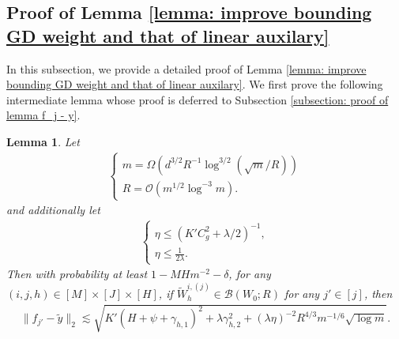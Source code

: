 \documentclass{article} \usepackage{iclr2023/iclr2023_conference,times}
\newtheorem{lemma}{Lemma}[section]
\begin{document}
\subsection{Proof of Lemma \ref{lemma: improve bounding GD weight and that of linear auxilary}}
In this subsection, we provide a detailed proof of Lemma \ref{lemma: improve bounding GD weight and that of linear auxilary}. We first prove the following intermediate lemma whose proof is deferred to Subsection \ref{subsection: proof of lemma f_j - y}. 

\begin{lemma}
Let 
\begin{align*}
    \begin{cases}
        m = \Omega \left( d^{3/2}  R^{-1} \log^{3/2} (\sqrt{m} / R) \right) \\
      R = \mathcal{O} \left( m^{1/2} \log^{-3} m \right). 
    \end{cases}
\end{align*}
 and additionally let 
\begin{align*}
\begin{cases}
    \eta \leq (K' C_g^2 + \lambda /2)^{-1}, \\ 
    \eta \leq \frac{1}{2 \lambda}.
\end{cases}
\end{align*}
Then with probability at least $1 - MH m^{-2} - \delta$, for any $(i,j,h) \in [M] \times [J] \times [H]$, if $\tilde{W}_h^{i,(j)} \in \mathcal{B}(W_0; R)$ for any $j' \in [j]$, then 
\begin{align*}
    \|f_{j'} - \tilde{y} \|_2 \lesssim \sqrt{  K'(H + \psi + \gamma_{h,1} )^2 + \lambda \gamma_{h,2}^2 + (\lambda \eta)^{-2} R^{4/3} m^{-1/6} \sqrt{ \log m}}. 
\end{align*}
\label{lemmaq: improved bound f_j - y}
\end{lemma}
\end{document}
